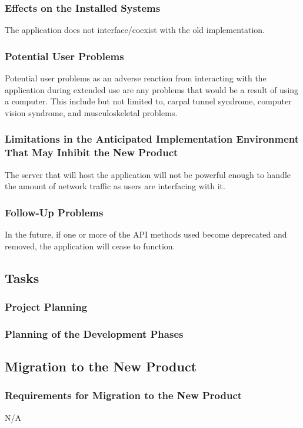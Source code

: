 \documentclass[12pt, titlepage]{article}
\begin{document}
\subsubsection{Effects on the Installed Systems}
The application does not interface/coexist with the old implementation.

\subsubsection{Potential User Problems}
Potential user problems as an adverse reaction from interacting with the application during extended use are any problems that would be a result of using a computer. This include but not limited to, carpal tunnel syndrome, computer vision syndrome, and musculoskeletal problems.

\subsubsection{Limitations in the Anticipated Implementation Environment That May Inhibit the New Product}
The server that will host the application will not be powerful enough to handle the amount of network traffic as users are interfacing with it.

\subsubsection{Follow-Up Problems}
In the future, if one or more of the API methods used become deprecated and removed, the application will cease to function.

\subsection{Tasks}
\subsubsection{Project Planning}


\subsubsection{Planning of the Development Phases}


\subsection{Migration to the New Product}
\subsubsection{Requirements for Migration to the New Product}
N/A
\end{document}
